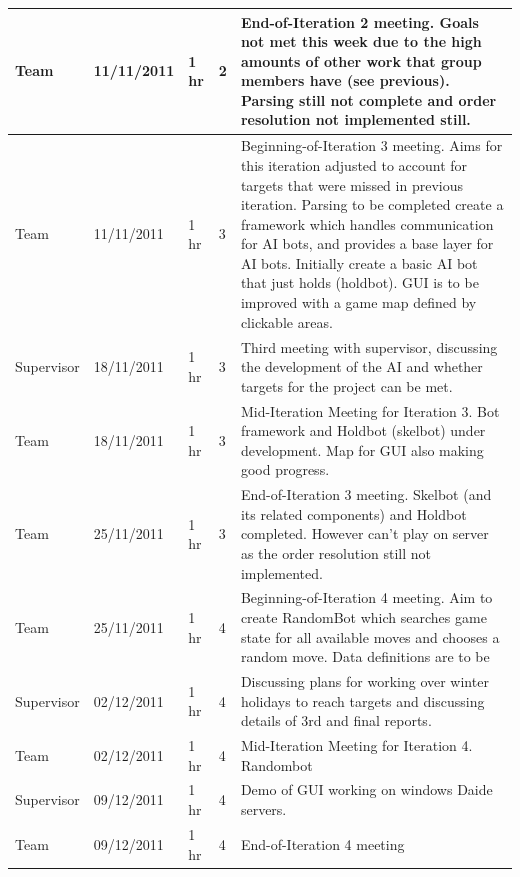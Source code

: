 \documentclass[11pt]{article}
\begin{document}
\begin{center}
{\begin{tabular}{ | l | l | l | l | p{12cm} |}
    Team               & 11/11/2011    & 1 hr      &     2       & End-of-Iteration 2 meeting. Goals not met this week due to the high amounts of other work that group members have (see previous). Parsing still not complete and order resolution not implemented still. \\ \hline
    Team               & 11/11/2011    & 1 hr      &     3       & Beginning-of-Iteration 3 meeting. Aims for this iteration adjusted to account for targets that were missed in previous iteration. Parsing to be completed create a framework which handles communication for AI bots, and provides a base layer for AI bots. Initially create a basic AI bot that just holds (holdbot). GUI is to be improved with a game map defined by clickable areas. \\ \hline
    Supervisor         & 18/11/2011    & 1 hr      &     3       & Third meeting with supervisor, discussing the development of the AI and whether targets for the project can be met.  \\ \hline
    Team               & 18/11/2011    & 1 hr      &     3       & Mid-Iteration Meeting for Iteration 3. Bot framework and Holdbot (skelbot) under development. Map for GUI also making good progress. \\ \hline
    Team               & 25/11/2011    & 1 hr      &     3       & End-of-Iteration 3 meeting. Skelbot (and its related components) and Holdbot completed. However can't play on server as the order resolution still not implemented. \\ \hline
    Team               & 25/11/2011    & 1 hr      &     4       & Beginning-of-Iteration 4 meeting. Aim to create RandomBot which searches game state for all available moves and chooses a random move. Data definitions are to be  \\ \hline
    Supervisor         & 02/12/2011    & 1 hr      &     4       & Discussing plans for working over winter holidays to reach targets and discussing details of 3rd and final reports. \\ \hline
    Team               & 02/12/2011    & 1 hr      &     4       & Mid-Iteration Meeting for Iteration 4. Randombot \\ \hline
    Supervisor         & 09/12/2011    & 1 hr      &     4       & Demo of GUI working on windows Daide servers. \\ \hline
    Team               & 09/12/2011    & 1 hr      &     4       & End-of-Iteration 4 meeting \\ \hline
    
    \end{tabular}
}

\end{center}
\end{document}
